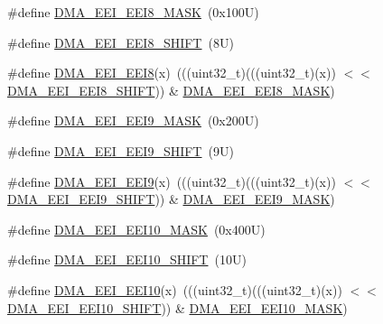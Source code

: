 \begin{DoxyCompactItemize}
\#define \mbox{\hyperlink{group___d_m_a___register___masks_ga2d338f7e6761f1d0d3847dbc6e83ac0b}{D\+M\+A\+\_\+\+E\+E\+I\+\_\+\+E\+E\+I8\+\_\+\+M\+A\+SK}}~(0x100\+U)
\item 
\#define \mbox{\hyperlink{group___d_m_a___register___masks_gab1611067f20ab64994e2373e0c7099ce}{D\+M\+A\+\_\+\+E\+E\+I\+\_\+\+E\+E\+I8\+\_\+\+S\+H\+I\+FT}}~(8\+U)
\item 
\#define \mbox{\hyperlink{group___d_m_a___register___masks_ga367fc057120250a89e9b5ab0eb8bf33a}{D\+M\+A\+\_\+\+E\+E\+I\+\_\+\+E\+E\+I8}}(x)~(((uint32\+\_\+t)(((uint32\+\_\+t)(x)) $<$$<$ \mbox{\hyperlink{group___d_m_a___register___masks_gab1611067f20ab64994e2373e0c7099ce}{D\+M\+A\+\_\+\+E\+E\+I\+\_\+\+E\+E\+I8\+\_\+\+S\+H\+I\+FT}})) \& \mbox{\hyperlink{group___d_m_a___register___masks_ga2d338f7e6761f1d0d3847dbc6e83ac0b}{D\+M\+A\+\_\+\+E\+E\+I\+\_\+\+E\+E\+I8\+\_\+\+M\+A\+SK}})
\item 
\#define \mbox{\hyperlink{group___d_m_a___register___masks_ga3789c428724cae433322eb15fe30ffe0}{D\+M\+A\+\_\+\+E\+E\+I\+\_\+\+E\+E\+I9\+\_\+\+M\+A\+SK}}~(0x200\+U)
\item 
\#define \mbox{\hyperlink{group___d_m_a___register___masks_gaec3bcfcdfc500657a0d160409ec97c3b}{D\+M\+A\+\_\+\+E\+E\+I\+\_\+\+E\+E\+I9\+\_\+\+S\+H\+I\+FT}}~(9\+U)
\item 
\#define \mbox{\hyperlink{group___d_m_a___register___masks_gab4dfac8b19e3295e1aeb91896ca58dbe}{D\+M\+A\+\_\+\+E\+E\+I\+\_\+\+E\+E\+I9}}(x)~(((uint32\+\_\+t)(((uint32\+\_\+t)(x)) $<$$<$ \mbox{\hyperlink{group___d_m_a___register___masks_gaec3bcfcdfc500657a0d160409ec97c3b}{D\+M\+A\+\_\+\+E\+E\+I\+\_\+\+E\+E\+I9\+\_\+\+S\+H\+I\+FT}})) \& \mbox{\hyperlink{group___d_m_a___register___masks_ga3789c428724cae433322eb15fe30ffe0}{D\+M\+A\+\_\+\+E\+E\+I\+\_\+\+E\+E\+I9\+\_\+\+M\+A\+SK}})
\item 
\#define \mbox{\hyperlink{group___d_m_a___register___masks_ga1c481b0acfde2edc2b0b72b8e8639cfb}{D\+M\+A\+\_\+\+E\+E\+I\+\_\+\+E\+E\+I10\+\_\+\+M\+A\+SK}}~(0x400\+U)
\item 
\#define \mbox{\hyperlink{group___d_m_a___register___masks_ga63dc550e1314188b965fd93adea213b8}{D\+M\+A\+\_\+\+E\+E\+I\+\_\+\+E\+E\+I10\+\_\+\+S\+H\+I\+FT}}~(10\+U)
\item 
\#define \mbox{\hyperlink{group___d_m_a___register___masks_ga04c2d5c30c5c422df57b951afddfd5ea}{D\+M\+A\+\_\+\+E\+E\+I\+\_\+\+E\+E\+I10}}(x)~(((uint32\+\_\+t)(((uint32\+\_\+t)(x)) $<$$<$ \mbox{\hyperlink{group___d_m_a___register___masks_ga63dc550e1314188b965fd93adea213b8}{D\+M\+A\+\_\+\+E\+E\+I\+\_\+\+E\+E\+I10\+\_\+\+S\+H\+I\+FT}})) \& \mbox{\hyperlink{group___d_m_a___register___masks_ga1c481b0acfde2edc2b0b72b8e8639cfb}{D\+M\+A\+\_\+\+E\+E\+I\+\_\+\+E\+E\+I10\+\_\+\+M\+A\+SK}})
$$
\end{DoxyCompactItemize}
